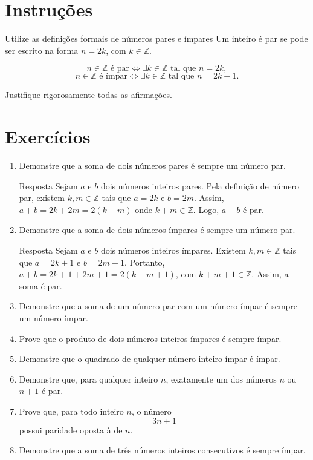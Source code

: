 \documentclass[12pt]{article}
\begin{document}
\vspace*{0.2cm}
 
\section*{Instruções}
\begin{block}{Utilize as definições formais de números pares e ímpares}
Um inteiro é par se pode ser escrito na forma \( n = 2k \), com \( k \in \mathbb{Z} \).


\[
    n \in \mathbb{Z} \text{ é par} \iff \exists k \in \mathbb{Z} \text{ tal que } n = 2k,
    \]
    \[
        n \in \mathbb{Z} \text{ é ímpar} \iff \exists k \in \mathbb{Z} \text{ tal que } n = 2k + 1.
        \]
    \end{block}
Justifique rigorosamente todas as afirmações.

\section*{Exercícios}

\begin{enumerate}

\item Demonstre que a soma de dois números pares é sempre um número par.
\begin{block}{Resposta}
Sejam $a$ e $b$ dois números inteiros pares. Pela definição de número par, existem
$k,m \in \mathbb{Z}$ tais que $a = 2k$ e $b = 2m$. Assim, $ a+b = 2k + 2m = 2(k+m)$
onde $k+m \in \mathbb{Z}$. Logo, $a+b$ é par.
\end{block}


\item Demonstre que a soma de dois números ímpares é sempre um número par.
\begin{block}{Resposta}
Sejam $a$ e $b$ dois números inteiros ímpares. Existem $k,m \in \mathbb{Z}$ tais que
$a = 2k+1$ e $b = 2m+1$. Portanto,
$a+b = 2k+1 + 2m+1 = 2(k+m+1)$,
com $k+m+1 \in \mathbb{Z}$. Assim, a soma é par.
\end{block}
\item Demonstre que a soma de um número par com um número ímpar é sempre um número ímpar.

\item Prove que o produto de dois números inteiros ímpares é sempre ímpar.

\item Demonstre que o quadrado de qualquer número inteiro ímpar é ímpar.

\item Demonstre que, para qualquer inteiro \( n \), exatamente um dos números \( n \) ou \( n+1 \) é par.

\item Prove que, para todo inteiro \( n \), o número
\[
3n + 1
\]
possui paridade oposta à de \( n \).

\item Demonstre que a soma de três números inteiros consecutivos é sempre ímpar.
\newpage
\end{enumerate}
\end{document}

